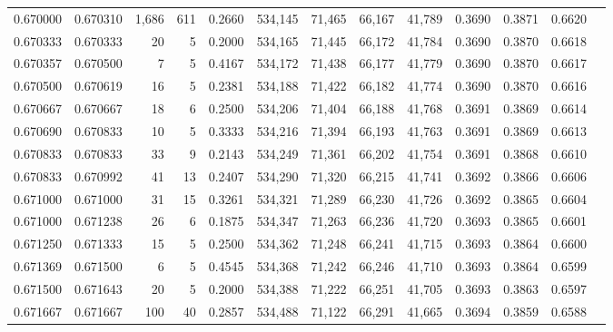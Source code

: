 \begin{tabular}{rrrrrrrrrrrrr}
0.670000 & 0.670310 & 1,686 & 611 &                                     0.2660 & 534,145 &  71,465 &  66,167 &  41,789 & 0.3690 & 0.3871 & 0.6620 \\
0.670333 & 0.670333 &    20 &   5 &                                     0.2000 & 534,165 &  71,445 &  66,172 &  41,784 & 0.3690 & 0.3870 & 0.6618 \\
0.670357 & 0.670500 &     7 &   5 &                                     0.4167 & 534,172 &  71,438 &  66,177 &  41,779 & 0.3690 & 0.3870 & 0.6617 \\
0.670500 & 0.670619 &    16 &   5 &                                     0.2381 & 534,188 &  71,422 &  66,182 &  41,774 & 0.3690 & 0.3870 & 0.6616 \\
0.670667 & 0.670667 &    18 &   6 &                                     0.2500 & 534,206 &  71,404 &  66,188 &  41,768 & 0.3691 & 0.3869 & 0.6614 \\
0.670690 & 0.670833 &    10 &   5 &                                     0.3333 & 534,216 &  71,394 &  66,193 &  41,763 & 0.3691 & 0.3869 & 0.6613 \\
0.670833 & 0.670833 &    33 &   9 &                                     0.2143 & 534,249 &  71,361 &  66,202 &  41,754 & 0.3691 & 0.3868 & 0.6610 \\
0.670833 & 0.670992 &    41 &  13 &                                     0.2407 & 534,290 &  71,320 &  66,215 &  41,741 & 0.3692 & 0.3866 & 0.6606 \\
0.671000 & 0.671000 &    31 &  15 &                                     0.3261 & 534,321 &  71,289 &  66,230 &  41,726 & 0.3692 & 0.3865 & 0.6604 \\
0.671000 & 0.671238 &    26 &   6 &                                     0.1875 & 534,347 &  71,263 &  66,236 &  41,720 & 0.3693 & 0.3865 & 0.6601 \\
0.671250 & 0.671333 &    15 &   5 &                                     0.2500 & 534,362 &  71,248 &  66,241 &  41,715 & 0.3693 & 0.3864 & 0.6600 \\
0.671369 & 0.671500 &     6 &   5 &                                     0.4545 & 534,368 &  71,242 &  66,246 &  41,710 & 0.3693 & 0.3864 & 0.6599 \\
0.671500 & 0.671643 &    20 &   5 &                                     0.2000 & 534,388 &  71,222 &  66,251 &  41,705 & 0.3693 & 0.3863 & 0.6597 \\
0.671667 & 0.671667 &   100 &  40 &                                     0.2857 & 534,488 &  71,122 &  66,291 &  41,665 & 0.3694 & 0.3859 & 0.6588 \\

\end{tabular}
